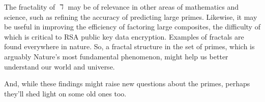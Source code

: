 \documentclass[12pt,longtitle,times]{amsart}
\begin{document}
The fractality of $\daleth$ may be of relevance in other areas of mathematics and science, such as refining the accuracy of predicting large primes. Likewise, it may be useful in improving the efficiency of factoring large composites, the difficulty of which is critical to RSA public key data encryption. Examples of fractals are found everywhere in nature. So, a fractal structure in the set of primes, which is arguably Nature's most fundamental phenomenon, might help us better understand our world and universe. 

And, while these findings might raise new questions about the primes, perhaps they'll shed light on some old ones too.

\nopagebreak{


}

\raggedbottom
\end{document}
